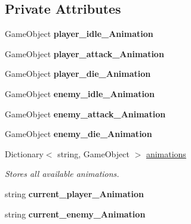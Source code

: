 \subsection*{Private Attributes}
\begin{DoxyCompactItemize}
\item 
\mbox{\label{class_animation_manager_a7d4c4e709012d79b5d0280df8dc969dd}} 
Game\+Object {\bfseries player\+\_\+idle\+\_\+\+Animation}
\item 
\mbox{\label{class_animation_manager_ac47bd136a0167570bc32c600793ea386}} 
Game\+Object {\bfseries player\+\_\+attack\+\_\+\+Animation}
\item 
\mbox{\label{class_animation_manager_a79d536bf45e1575de70ef9fef6806f66}} 
Game\+Object {\bfseries player\+\_\+die\+\_\+\+Animation}
\item 
\mbox{\label{class_animation_manager_ac301b4ba5dc18d2899769b53a660f17c}} 
Game\+Object {\bfseries enemy\+\_\+idle\+\_\+\+Animation}
\item 
\mbox{\label{class_animation_manager_afde052f938d2e0d411c79c5d04c68077}} 
Game\+Object {\bfseries enemy\+\_\+attack\+\_\+\+Animation}
\item 
\mbox{\label{class_animation_manager_ab5c3493c712e06dafe93676c80805f17}} 
Game\+Object {\bfseries enemy\+\_\+die\+\_\+\+Animation}
\item 
\mbox{\label{class_animation_manager_a9300d9a81ec105f22aad052a4f04eca1}} 
Dictionary$<$ string, Game\+Object $>$ \mbox{\hyperlink{class_animation_manager_a9300d9a81ec105f22aad052a4f04eca1}{animations}}
\begin{DoxyCompactList}\small\item\em Stores all available animations. \end{DoxyCompactList}\item 
\mbox{\label{class_animation_manager_aef0c8a682a163cbb1222604d4e7887c3}} 
string {\bfseries current\+\_\+player\+\_\+\+Animation}
\item 
\mbox{\label{class_animation_manager_a358d48e7e9b63bb00f8b866e16a41a21}} 
string {\bfseries current\+\_\+enemy\+\_\+\+Animation}
\end{DoxyCompactItemize}



